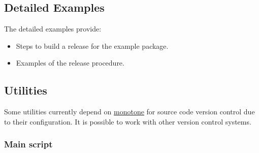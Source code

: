 \documentclass[12pt]{article}
\begin{document}
\subsection*{Detailed Examples}
The detailed examples provide:
\begin{itemize}
   \item[]Steps to build a release for the example {\tt <your-software>} package.
   \item[]Examples of the release procedure.
\end{itemize}

\subsection*{Utilities}
Some utilities currently depend on \href{http://monotone.ca}{monotone} for source code version control due to their configuration. It is possible to work with other version control systems.

\subsubsection*{Main script}
\end{document}

